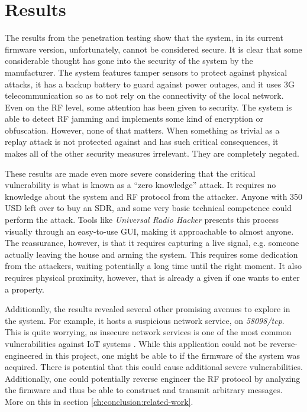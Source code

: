 \section{Results}
The results from the penetration testing show that the system, in its current firmware version, unfortunately, cannot be considered secure. It is clear that some considerable thought has gone into the security of the system by the manufacturer. The system features tamper sensors to protect against physical attacks, it has a backup battery to guard against power outages, and it uses 3G telecommunication so as to not rely on the connectivity of the local network. Even on the RF level, some attention has been given to security. The system is able to detect RF jamming and implements some kind of encryption or obfuscation. However, none of that matters. When something as trivial as a replay attack is not protected against and has such critical consequences, it makes all of the other security measures irrelevant. They are completely negated.

These results are made even more severe considering that the critical vulnerability is what is known as a \enquote{zero knowledge} attack. It requires no knowledge about the system and RF protocol from the attacker. Anyone with 350 USD left over to buy an SDR, and some very basic technical competence could perform the attack. Tools like \textit{Universal Radio Hacker} \cite{urh} presents this process visually through an easy-to-use GUI, making it approachable to almost anyone. The reassurance, however, is that it requires capturing a live signal, e.g. someone actually leaving the house and arming the system. This requires some dedication from the attackers, waiting potentially a long time until the right moment. It also requires physical proximity, however, that is already a given if one wants to enter a property.

Additionally, the results revealed several other promising avenues to explore in the system. For example, it hosts a suspicious network service, on \textit{58098/tcp}. This is quite worrying, as insecure network services is one of the most common vulnerabilities against IoT systems \cite{owasp-iot-top10}. While this application could not be reverse-engineered in this project, one might be able to if the firmware of the system was acquired. There is potential that this could cause additional severe vulnerabilities. Additionally, one could potentially reverse engineer the RF protocol by analyzing the firmware and thus be able to construct and transmit arbitrary messages. More on this in section \ref{ch:conclusion:related-work}.

